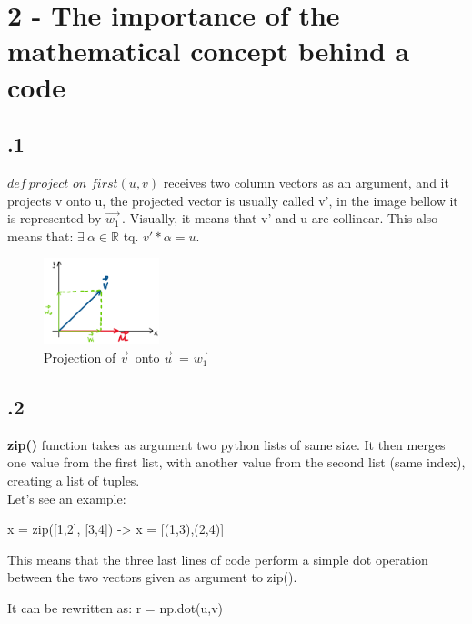 \documentclass[a4paper]{article}
\begin{document}
\section*{2 - The importance of the mathematical concept behind a code}
\subsection*{.1}
\textbf{$def \ project\_on\_first(u, v)$} receives two column vectors as an argument, and it projects v onto u, the projected vector is usually called v', in the image bellow it is represented by $\vec{w_{1}}^{\,}$. Visually, it means that v' and u are collinear. This also means that: $\exists\ \alpha \in \mathbb{R}$ tq. $v'*\alpha = u$.
\begin{figure}[H]
\center
\includegraphics[width=0.3\textwidth]{images/projection.PNG}
\caption{Projection of $\vec{v}^{\,}$ onto $\vec{u}^{\,}$ = $\vec{w_{1}}^{\,}$}
\end{figure}
\subsection*{.2}
\textbf{zip()} function takes as argument two python lists of same size. It then merges one value from the first list, with another value from the second list (same index), creating a list of tuples. \\
Let's see an example:
\begin{center}
x = zip([1,2], [3,4]) -> x = [(1,3),(2,4)]
\end{center}
This means that the three last lines of code perform a simple dot operation between the two vectors given as argument to zip().
\begin{center}
It can be rewritten as: r = np.dot(u,v)
\end{center}
\end{document}
